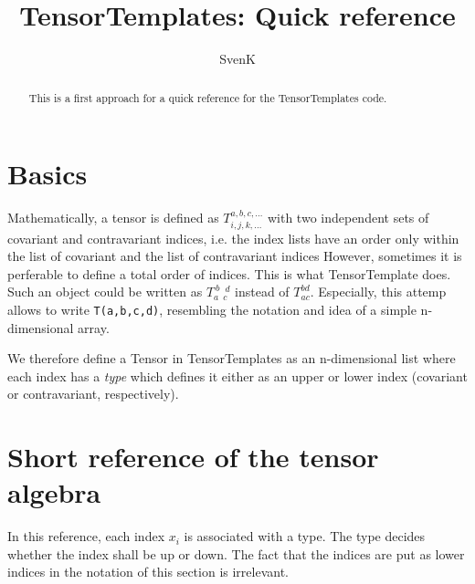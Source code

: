 \documentclass[a4paper]{article}
\begin{document}
\title{TensorTemplates: Quick reference} 
\author{SvenK}

\maketitle

\begin{abstract}
This is a first approach for a quick
reference for the TensorTemplates code. \end{abstract}

\section{Basics}

Mathematically, a tensor is defined as $T^{a,b,c,\dots}_{i,j,k,\dots}$ with two independent sets of covariant and contravariant indices, i.e. the index lists have an order only within the list of covariant and the list of contravariant indices However, sometimes it is perferable to define a total order of indices. This is what TensorTemplate does. Such an object could be written as $T_a^{~b} {~}_c^{~d}$ instead of $T_{ac}^{bd}$. Especially, this attemp allows to write \texttt{T(a,b,c,d)}, resembling the notation and idea of a simple n-dimensional array.

We therefore define a Tensor in TensorTemplates as an n-dimensional list where each index has a \emph{type} which defines it either as an upper or lower index (covariant or contravariant, respectively).

\section{Short reference of the tensor algebra}
In this reference, each index $x_i$ is
associated with a type. The type decides whether
the index shall be up or down. The fact that
the indices are put as lower indices in the
notation of this section is irrelevant.
\end{document}
